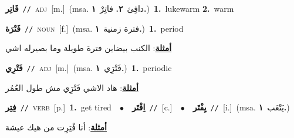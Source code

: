 \documentclass[10pt,a4paper,twoside]{article} %
\begin{document}
\begin{multicols}{2}
{\setlength\topsep{0pt}\textbf{\foreignlanguage{arabic}{فَاتِر}}\ {\color{gray}\texttt{//}\color{black}}\ \textsc{adj}\ [m.]\ \color{gray}(msa. \foreignlanguage{arabic}{دافِئ}~\foreignlanguage{arabic}{\textbf{٢.}}  \foreignlanguage{arabic}{فاتِرْ}~\foreignlanguage{arabic}{\textbf{١.}})\color{black}\ \textbf{1.}~lukewarm  \textbf{2.}~warm\ } \vspace{2mm}

{\setlength\topsep{0pt}\textbf{\foreignlanguage{arabic}{فَتْرَة}}\ {\color{gray}\texttt{//}\color{black}}\ \textsc{noun}\ [f.]\ \color{gray}(msa. \foreignlanguage{arabic}{فترة زمنية}~\foreignlanguage{arabic}{\textbf{١.}})\color{black}\ \textbf{1.}~period\  \begin{flushright}\color{gray}\foreignlanguage{arabic}{\textbf{\underline{\foreignlanguage{arabic}{أمثلة}}}: الكنب بيضاين فترة طويلة وما بصيرله اشي}\end{flushright}\color{black}} \vspace{2mm}

{\setlength\topsep{0pt}\textbf{\foreignlanguage{arabic}{فَتْرِي}}\ {\color{gray}\texttt{//}\color{black}}\ \textsc{adj}\ [m.]\ \color{gray}(msa. \foreignlanguage{arabic}{فَتْرَِي}~\foreignlanguage{arabic}{\textbf{١.}})\color{black}\ \textbf{1.}~periodic\  \begin{flushright}\color{gray}\foreignlanguage{arabic}{\textbf{\underline{\foreignlanguage{arabic}{أمثلة}}}: هاد الاشي فَتْرَِي مش طول العُمُر}\end{flushright}\color{black}} \vspace{2mm}

{\setlength\topsep{0pt}\textbf{\foreignlanguage{arabic}{فِتِر}}\ {\color{gray}\texttt{//}\color{black}}\ \textsc{verb}\ [p.]\ \textbf{1.}~get tired\ \ $\bullet$\ \ \setlength\topsep{0pt}\textbf{\foreignlanguage{arabic}{اِفْتَر}}\ {\color{gray}\texttt{//}\color{black}}\ [c.]\ \ $\bullet$\ \ \setlength\topsep{0pt}\textbf{\foreignlanguage{arabic}{يِفْتَر}}\ {\color{gray}\texttt{//}\color{black}}\ [i.]\ \color{gray}(msa. \foreignlanguage{arabic}{يَتْعَب}~\foreignlanguage{arabic}{\textbf{١.}})\color{black}\  \begin{flushright}\color{gray}\foreignlanguage{arabic}{\textbf{\underline{\foreignlanguage{arabic}{أمثلة}}}: أنا فْتِرِت من هيك عيشة}\end{flushright}\color{black}} \vspace{2mm}


\end{multicols}
\end{document}
